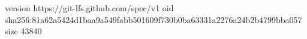 version https://git-lfs.github.com/spec/v1
oid sha256:81a62a5424d1baa9a549fabb501609f730b0ba63331a2276a24b2b4799bba057
size 43840
